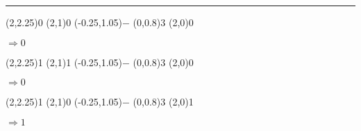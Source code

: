 \documentclass[11pt,a4paper]{article}
\begin{document}
\begin{center}
\rule{1.0\linewidth}{0.75pt}

\begin{table}[ht!]
  \centering
  \begin{minipage}{0.15\textwidth}

\par\vspace{3\oplineheight}
\oplput(2,2.25){0}
\oplput(2,1){0}
\oplput(-0.25,1.05){$-$}
\ophline(0,0.8){3}
\oplput(2,0){0}

\medskip

$ \Rightarrow 0 $

  \end{minipage}
  \hfillx
  \vrule\begin{minipage}{0.05\textwidth}

  \end{minipage}
  \hfillx
  \begin{minipage}{0.15\textwidth}

\par\vspace{3\oplineheight}
\oplput(2,2.25){1}
\oplput(2,1){1}
\oplput(-0.25,1.05){$-$}
\ophline(0,0.8){3}
\oplput(2,0){0}

\medskip

$ \Rightarrow 0 $

  \end{minipage}
  \hfillx
  \vrule\begin{minipage}{0.05\textwidth}

  \end{minipage}
  \hfillx
  \begin{minipage}{0.15\textwidth}

\par\vspace{3\oplineheight}
\oplput(2,2.25){1}
\oplput(2,1){0}
\oplput(-0.25,1.05){$-$}
\ophline(0,0.8){3}
\oplput(2,0){1}

\medskip

$ \Rightarrow 1 $

  \end{minipage}
  \hfillx
  \vrule\begin{minipage}{0.05\textwidth}

  \end{minipage}
  \hfillx
  \begin{minipage}{0.15\textwidth}


\end{minipage}
\end{table}
\end{center}
\end{document}
